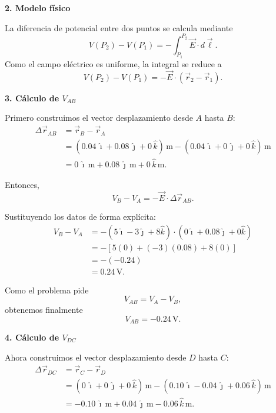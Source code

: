 \documentclass[11pt]{article}
\begin{document}
\textbf{2. Modelo f\'isico}

La diferencia de potencial entre dos puntos se calcula mediante
\begin{equation*}
    V(P_2)-V(P_1)=-\int_{P_1}^{P_2}\vec E\cdot d\vec \ell.
\end{equation*}
Como el campo el\'ectrico es uniforme, la integral se reduce a
\begin{equation*}
    V(P_2)-V(P_1)=-\vec E\cdot(\vec r_2-\vec r_1).
\end{equation*}

\textbf{3. C\'alculo de $V_{AB}$}

Primero construimos el vector desplazamiento desde $A$ hasta $B$:
\begin{align*}
    \Delta \vec r_{AB}
    &=\vec r_B-\vec r_A\\
    &=(0.04\,\hat{\imath}+0.08\,\hat{\jmath}+0\,\hat{k})\,\text{m}
      -(0.04\,\hat{\imath}+0\,\hat{\jmath}+0\,\hat{k})\,\text{m}\\
    &=0\,\hat{\imath}\,\text{m}+0.08\,\hat{\jmath}\,\text{m}+0\,\hat{k}\,\text{m}.
\end{align*}

Entonces,
\begin{equation*}
    V_B-V_A=-\vec E\cdot\Delta \vec r_{AB}.
\end{equation*}

Sustituyendo los datos de forma expl\'icita:
\begin{align*}
    V_B-V_A
    &=-\left(5\hat{\imath}-3\hat{\jmath}+8\hat{k}\right)\cdot
      \left(0\hat{\imath}+0.08\hat{\jmath}+0\hat{k}\right)\\
    &=-\left[5(0)+(-3)(0.08)+8(0)\right]\\
    &=-(-0.24)\\
    &=0.24\,\text{V}.
\end{align*}

Como el problema pide
\begin{equation*}
    V_{AB}=V_A-V_B,
\end{equation*}
obtenemos finalmente
\begin{equation*}
    \boxed{V_{AB}=-0.24\,\text{V}.}
\end{equation*}

\textbf{4. C\'alculo de $V_{DC}$}

Ahora construimos el vector desplazamiento desde $D$ hasta $C$:
\begin{align*}
    \Delta \vec r_{DC}
    &=\vec r_C-\vec r_D\\
    &=(0\,\hat{\imath}+0\,\hat{\jmath}+0\,\hat{k})\,\text{m}
      -(0.10\,\hat{\imath}-0.04\,\hat{\jmath}+0.06\,\hat{k})\,\text{m}\\
    &=-0.10\,\hat{\imath}\,\text{m}+0.04\,\hat{\jmath}\,\text{m}-0.06\,\hat{k}\,\text{m}.
\end{align*}
\end{document}
